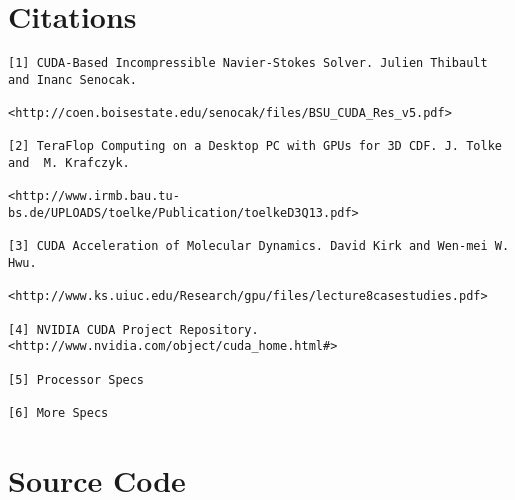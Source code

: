 \documentclass[10pt]{article}
\begin{document}
\section{Citations}


\begin{verbatim}
[1] CUDA-Based Incompressible Navier-Stokes Solver. Julien Thibault and Inanc Senocak.

<http://coen.boisestate.edu/senocak/files/BSU_CUDA_Res_v5.pdf>

[2] TeraFlop Computing on a Desktop PC with GPUs for 3D CDF. J. Tolke and  M. Krafczyk.  

<http://www.irmb.bau.tu-bs.de/UPLOADS/toelke/Publication/toelkeD3Q13.pdf>

[3] CUDA Acceleration of Molecular Dynamics. David Kirk and Wen-mei W. Hwu.  

<http://www.ks.uiuc.edu/Research/gpu/files/lecture8casestudies.pdf>

[4] NVIDIA CUDA Project Repository. <http://www.nvidia.com/object/cuda_home.html#>

[5] Processor Specs

[6] More Specs
\end{verbatim}

\appendix
\section{Source Code}
\end{document}

